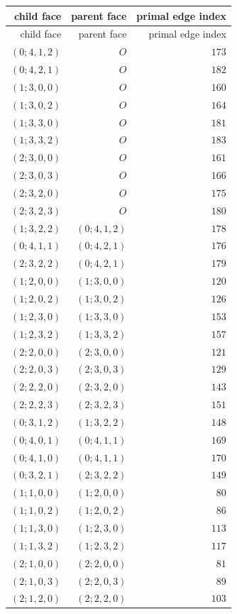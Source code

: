 \begin{longtable}{@{}rrr@{}}
\toprule child face & parent face & primal edge index\\ \midrule
\endfirsthead \toprule child face & parent face & primal edge index\\ \midrule \endhead
$(0;4,1,2)$ & $O$ & $173$\\
$(0;4,2,1)$ & $O$ & $182$\\
$(1;3,0,0)$ & $O$ & $160$\\
$(1;3,0,2)$ & $O$ & $164$\\
$(1;3,3,0)$ & $O$ & $181$\\
$(1;3,3,2)$ & $O$ & $183$\\
$(2;3,0,0)$ & $O$ & $161$\\
$(2;3,0,3)$ & $O$ & $166$\\
$(2;3,2,0)$ & $O$ & $175$\\
$(2;3,2,3)$ & $O$ & $180$\\
$(1;3,2,2)$ & $(0;4,1,2)$ & $178$\\
$(0;4,1,1)$ & $(0;4,2,1)$ & $176$\\
$(2;3,2,2)$ & $(0;4,2,1)$ & $179$\\
$(1;2,0,0)$ & $(1;3,0,0)$ & $120$\\
$(1;2,0,2)$ & $(1;3,0,2)$ & $126$\\
$(1;2,3,0)$ & $(1;3,3,0)$ & $153$\\
$(1;2,3,2)$ & $(1;3,3,2)$ & $157$\\
$(2;2,0,0)$ & $(2;3,0,0)$ & $121$\\
$(2;2,0,3)$ & $(2;3,0,3)$ & $129$\\
$(2;2,2,0)$ & $(2;3,2,0)$ & $143$\\
$(2;2,2,3)$ & $(2;3,2,3)$ & $151$\\
$(0;3,1,2)$ & $(1;3,2,2)$ & $148$\\
$(0;4,0,1)$ & $(0;4,1,1)$ & $169$\\
$(0;4,1,0)$ & $(0;4,1,1)$ & $170$\\
$(0;3,2,1)$ & $(2;3,2,2)$ & $149$\\
$(1;1,0,0)$ & $(1;2,0,0)$ & $80$\\
$(1;1,0,2)$ & $(1;2,0,2)$ & $86$\\
$(1;1,3,0)$ & $(1;2,3,0)$ & $113$\\
$(1;1,3,2)$ & $(1;2,3,2)$ & $117$\\
$(2;1,0,0)$ & $(2;2,0,0)$ & $81$\\
$(2;1,0,3)$ & $(2;2,0,3)$ & $89$\\
$(2;1,2,0)$ & $(2;2,2,0)$ & $103$\\

\end{longtable}
